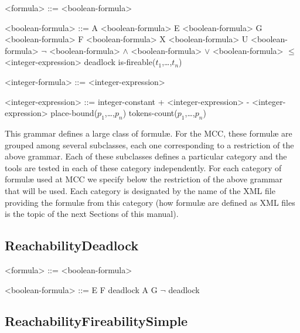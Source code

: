 \documentclass[10pt,english,a4paper]{article}
\begin{document}
\begin{grammar}
<formula> ::= <boolean-formula>

<boolean-formula> ::= A <boolean-formula>
\alt E <boolean-formula>
\alt G <boolean-formula>
\alt F <boolean-formula>
\alt X <boolean-formula>
 U <boolean-formula>
\alt $\lnot$ <boolean-formula>
 $\wedge$ <boolean-formula>
 $\vee$ <boolean-formula>
 $\leq$ <integer-expression>
\alt deadlock
\alt is-fireable($t_1$,\dots,$t_n$)

<integer-formula> ::= <integer-expression>

<integer-expression> ::= integer-constant
 + <integer-expression>
 - <integer-expression>
\alt place-bound($p_1$,\dots,$p_n$)
\alt tokens-count($p_1$,\dots,$p_n$)

\end{grammar}

This grammar defines a large class of formulæ.
For the MCC, these formulæ are grouped among several subclasses, each one corresponding to a restriction of the above grammar.
Each of these subclasses defines a particular category and the tools are tested in each of these category independently.
For each category of formulæ used at MCC we specify below the restriction of the above grammar that will be used.
Each category is designated by the name of the XML file providing the formulæ from this category (how formulæ are defined as XML files is the topic of the next Sections of this manual).

%
%
%
%
%

\subsection{ReachabilityDeadlock}

\begin{grammar}

<formula> ::= <boolean-formula>

<boolean-formula> ::= E F deadlock 
\alt A G $\lnot$ deadlock

\end{grammar}

\subsection{ReachabilityFireabilitySimple}
\end{document}

